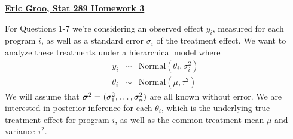 \documentclass[12pt]{article}
\newcommand{\si}{\mbox{\boldmath $\sigma$}}
\begin{document}
\begin{center}
{\large {\underline {\bf Eric Groo, Stat 289 Homework 3}}}
\end{center}

\vspace{.2cm}

\vspace{.2cm}
\noindent For Questions 1-7 we're considering an observed effect $y_i$, measured for each program $i$, as well as a standard error $\sigma_i$ of the treatment effect.  We want to analyze these treatments under a hierarchical model where
\begin{eqnarray*}
      y_i & \sim & \mbox{Normal}(\theta_i,\sigma^2_i)\\
 \theta_i & \sim & \mbox{Normal}(\mu,\tau^2)
\end{eqnarray*}
We will assume that $\si^2=(\sigma^2_1,\ldots,\sigma^2_n)$ are all known without error. 
We are interested in posterior inference for each $\theta_i$, which is the underlying true 
treatment effect for program $i$, as well as the common treatment mean $\mu$ and variance 
$\tau^2$.
\end{document}
